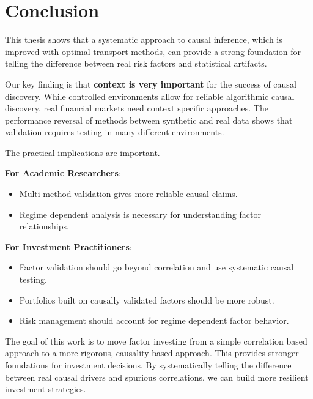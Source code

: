 \section{Conclusion}

This thesis shows that a systematic approach to causal inference, which is improved with optimal transport methods, can provide a strong foundation for telling the difference between real risk factors and statistical artifacts.

Our key finding is that \textbf{context is very important} for the success of causal discovery. While controlled environments allow for reliable algorithmic causal discovery, real financial markets need context specific approaches. The performance reversal of methods between synthetic and real data shows that validation requires testing in many different environments.

The practical implications are important.

\textbf{For Academic Researchers}:
\begin{itemize}
    \item Multi-method validation gives more reliable causal claims.
    \item Regime dependent analysis is necessary for understanding factor relationships.
\end{itemize}

\textbf{For Investment Practitioners}:
\begin{itemize}
    \item Factor validation should go beyond correlation and use systematic causal testing.
    \item Portfolios built on causally validated factors should be more robust.
    \item Risk management should account for regime dependent factor behavior.
\end{itemize}

The goal of this work is to move factor investing from a simple correlation based approach to a more rigorous, causality based approach. This provides stronger foundations for investment decisions. By systematically telling the difference between real causal drivers and spurious correlations, we can build more resilient investment strategies.